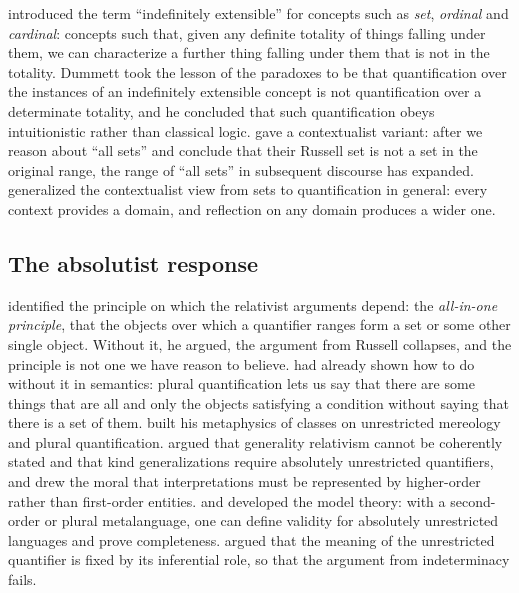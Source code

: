 \documentclass{situationist-preprint}
\begin{document}
\citet{Dummett1963,Dummett1991} introduced the term \enquote{indefinitely extensible} for concepts such as \emph{set}, \emph{ordinal} and \emph{cardinal}: concepts such that, given any definite totality of things falling under them, we can characterize a further thing falling under them that is not in the totality. Dummett took the lesson of the paradoxes to be that quantification over the instances of an indefinitely extensible concept is not quantification over a determinate totality, and he concluded that such quantification obeys intuitionistic rather than classical logic. \citet{Parsons1974} gave a contextualist variant: after we reason about \enquote{all sets} and conclude that their Russell set is not a set in the original range, the range of \enquote{all sets} in subsequent discourse has expanded. \citet{Glanzberg2004,Glanzberg2006} generalized the contextualist view from sets to quantification in general: every context provides a domain, and reflection on any domain produces a wider one.

\subsection{The absolutist response}

\citet{Cartwright1994} identified the principle on which the relativist arguments depend: the \emph{all-in-one principle}, that the objects over which a quantifier ranges form a set or some other single object. Without it, he argued, the argument from Russell collapses, and the principle is not one we have reason to believe. \citet{Boolos1984,Boolos1985} had already shown how to do without it in semantics: plural quantification lets us say that there are some things that are all and only the objects satisfying a condition without saying that there is a set of them. \citet{Lewis1991} built his metaphysics of classes on unrestricted mereology and plural quantification. \citet{Williamson2003} argued that generality relativism cannot be coherently stated and that kind generalizations require absolutely unrestricted quantifiers, and drew the moral that interpretations must be represented by higher-order rather than first-order entities. \citet{RayoUzquiano1999} and \citet{RayoWilliamson2003} developed the model theory: with a second-order or plural metalanguage, one can define validity for absolutely unrestricted languages and prove completeness. \citet{McGee2000} argued that the meaning of the unrestricted quantifier is fixed by its inferential role, so that the argument from indeterminacy fails.
\end{document}
